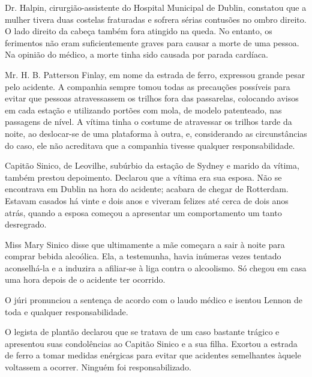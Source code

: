 Dr. Halpin, cirurgião-assistente do Hospital Municipal de Dublin,
constatou que a mulher tivera duas costelas fraturadas e sofrera
sérias contusões no ombro direito. O lado direito da cabeça também
fora atingido na queda. No entanto, os ferimentos não eram
suficientemente graves para causar a morte de uma pessoa. Na opinião
do médico, a morte tinha sido causada por parada cardíaca.

Mr. H. B. Patterson Finlay, em nome da estrada de ferro, expressou
grande pesar pelo acidente. A companhia sempre tomou todas as
precauções possíveis para evitar que pessoas atravessassem os trilhos
fora das passarelas, colocando avisos em cada estação e utilizando
portões com mola, de modelo patenteado, nas passagens de nível. A
vítima tinha o costume de atravessar os trilhos tarde da noite, ao
deslocar-se de uma plataforma à outra, e, considerando as
circunstâncias do caso, ele não acreditava que a companhia tivesse
qualquer responsabilidade.

Capitão Sinico, de Leovilhe, subúrbio da estação de Sydney e marido
da vítima, também prestou depoimento. Declarou que a vítima era sua
esposa. Não se encontrava em Dublin na hora do acidente; acabara de
chegar de Rotterdam. Estavam casados há vinte e dois anos e viveram
felizes até cerca de dois anos atrás, quando a esposa começou a
apresentar um comportamento um tanto desregrado.

Miss Mary Sinico disse que ultimamente a mãe começara a sair à noite
para comprar bebida alcoólica. Ela, a testemunha, havia inúmeras vezes
tentado aconselhá-la e a induzira a afiliar-se à liga contra o
alcoolismo. Só chegou em casa uma hora depois de o acidente ter
ocorrido.

O júri pronunciou a sentença de acordo com o laudo médico e isentou
Lennon de toda e qualquer responsabilidade.

O legista de plantão declarou que se tratava de um caso bastante
trágico e apresentou suas condolências ao Capitão Sinico e a sua
filha. Exortou a estrada de ferro a tomar medidas enérgicas para
evitar que acidentes semelhantes àquele voltassem a ocorrer. Ninguém
foi responsabilizado.

\asterisc

